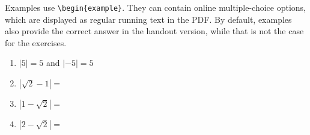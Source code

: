 \documentclass{ximera}
\begin{document}
Examples use \verb|\begin{example}|. They can contain online multiple-choice options, which are displayed as regular running text in the PDF.
By default, examples also provide the correct answer in the handout version, while that is not the case for the exercises.

\renewcommand{\choiceminimumverticalsize}{\vphantom{$\sqrt{2}$}} 

\begin{example} \nl 

\begin{xmmulticols}
		\begin{enumerate}
			\item $|5|=5$ and $|-5|=5$
			\item $|\sqrt{2}-1| = $
			\item $|1-\sqrt{2}| = $
			\item $|2-\sqrt{2}| = $
		\end{enumerate}
\end{xmmulticols}
\end{example}
\end{document}
